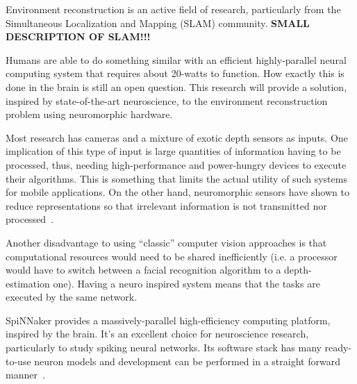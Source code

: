 Environment reconstruction is an active field of research, particularly from the Simultaneous Localization and Mapping (SLAM) community\cite{Thrun2008_SLAM}. \textbf{SMALL DESCRIPTION OF SLAM!!!} 

Humans are able to do something similar with an efficient highly-parallel neural computing system that requires about 20-watts to function. How exactly this is done in the brain is still an open question. This research will provide a solution, inspired by state-of-the-art neuroscience, to the environment reconstruction problem using neuromorphic hardware.

Most research has cameras and a mixture of exotic depth sensors as inputs. One implication of this type of input is large quantities of information having to be processed, thus, needing high-performance and power-hungry devices to execute their algorithms. This is something that limits the actual utility of such systems for mobile applications. On the other hand, neuromorphic sensors have shown to reduce representations so that irrelevant information is not transmitted nor processed~\cite{aer-retina-bernabe,dvs-zurich}.

Another disadvantage to using ``classic'' computer vision approaches is that computational resources would need to be shared inefficiently (i.e. a processor would have to switch between a facial recognition algorithm to a depth-estimation one). Having a neuro inspired system means that the tasks are executed by the same network.

SpiNNaker provides a massively-parallel high-efficiency computing platform, inspired by the brain. It's an excellent choice for neuroscience research, particularly to study spiking neural networks. Its software stack has many ready-to-use neuron models and development can be performed in a straight forward manner~\cite{furber2014spinnaker}. 


